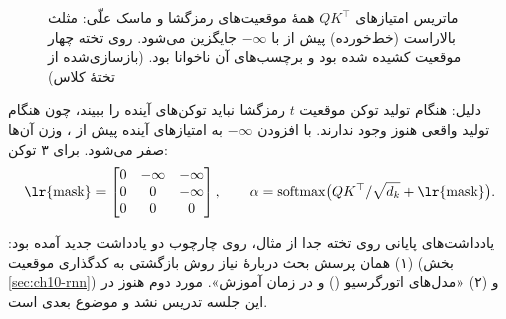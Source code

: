 \begin{figure}[htbp]
\centering
{}
\caption{ماتریس امتیازهای $QK^{\top}$ همهٔ موقعیت‌های رمزگشا و ماسک علّی: مثلث بالا‌راست (خط‌خورده) پیش از  با $-\infty$ جایگزین می‌شود. روی تخته چهار موقعیت کشیده شده بود و برچسب‌های آن ناخوانا بود. (بازسازی‌شده از تختهٔ کلاس)}
\end{figure}

دلیل: هنگام تولید توکن موقعیت $t$ رمزگشا نباید توکن‌های آینده را ببیند، چون هنگام تولید واقعی هنوز وجود ندارند. با افزودن $-\infty$ به امتیازهای آینده پیش از ، وزن آن‌ها صفر می‌شود. برای ۳ توکن:
\[
\text{\lr{mask}}=\begin{bmatrix}0&-\infty&-\infty\\0&0&-\infty\\0&0&0\end{bmatrix},\qquad
\alpha=\mathrm{softmax}\big(QK^\top/\sqrt{d_k}+\text{\lr{mask}}\big).
\]
\begin{exambox}{یادداشت‌های پایانی روی تخته}
جدا از مثال، روی چارچوب  دو یادداشت جدید آمده بود: (۱) همان پرسش بحث دربارهٔ نیاز روش بازگشتی به کدگذاری موقعیت (بخش \ref{sec:ch10-rnn}) و (۲) «مدل‌های اتورگرسیو () و  در زمان آموزش». مورد دوم هنوز در این جلسه تدریس نشد و موضوع بعدی است.
\end{exambox}

